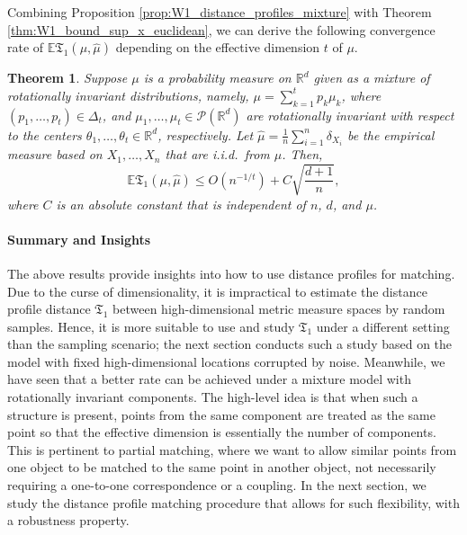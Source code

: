 \documentclass[11pt,letterpaper]{article}
\newtheorem{theorem}{Theorem} %
\theoremstyle{definition}
\numberwithin{equation}{section}
\newcommand{\R}{\mathbb{R}}
\newcommand{\E}{\mathbb{E}} %
\begin{document}
Combining Proposition \ref{prop:W1_distance_profiles_mixture} with Theorem \ref{thm:W1_bound_sup_x_euclidean}, we can derive the following convergence rate of $\E \mathfrak{T}_1(\mu, \hat{\mu})$ depending on the effective dimension $t$ of $\mu$.

\begin{theorem}
    \label{thm:convergence_TLB_mixture}
    Suppose $\mu$ is a probability measure on $\R^d$ given as a mixture of rotationally invariant distributions, namely, $\mu = \sum_{k = 1}^{t} p_k \mu_k$, where $(p_1, \ldots, p_t) \in \Delta_t$, and $\mu_1, \ldots, \mu_t \in \mathscr{P}(\R^d)$ are rotationally invariant with respect to the centers $\theta_1, \ldots, \theta_t \in \R^d$, respectively. Let $\hat{\mu} = \frac{1}{n} \sum_{i = 1}^{n} \delta_{X_i}$ be the empirical measure based on $X_1, \ldots, X_n$ that are i.i.d.\ from $\mu$. Then, 
    \begin{equation*}
        \E \mathfrak{T}_1(\mu, \hat{\mu}) \le O(n^{-1 / t}) + C \sqrt{\frac{d + 1}{n}},
    \end{equation*}
    where $C$ is an absolute constant that is independent of $n$, $d$, and $\mu$.
\end{theorem}

\paragraph{Summary and Insights}
The above results provide insights into how to use distance profiles for matching. Due to the curse of dimensionality, it is impractical to estimate the distance profile distance $\mathfrak{T}_1$ between high-dimensional metric measure spaces by random samples. Hence, it is more suitable to use and study $\mathfrak{T}_1$ under a different setting than the sampling scenario; the next section conducts such a study based on the model with fixed high-dimensional locations corrupted by noise. Meanwhile, we have seen that a better rate can be achieved under a mixture model with rotationally invariant components. The high-level idea is that when such a structure is present, points from the same component are treated as the same point so that the effective dimension is essentially the number of components. This is pertinent to partial matching, where we want to allow similar points from one object to be matched to the same point in another object, not necessarily requiring a one-to-one correspondence or a coupling. In the next section, we study the distance profile matching procedure that allows for such flexibility, with a robustness property. 
\end{document}
